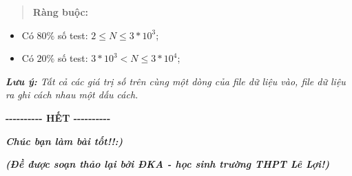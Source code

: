 \documentclass[
]{article}
\begin{document}
\begin{quote}
\textbf{Ràng buộc:}
\end{quote}

\begin{itemize}
\item
  Có \(80\%\) số test: \(2 \leq N \leq 3*10^{3}\);
\item
  Có \(20\%\) số test: \(3*10^{3} < N \leq 3*10^{4}\);
\end{itemize}

\emph{\textbf{Lưu ý:} Tất cả các giá trị số trên cùng một dòng của file
dữ liệu vào, file dữ liệu ra ghi cách nhau một dấu cách.}

\textbf{-\/-\/-\/-\/-\/-\/-\/-\/-\/- HẾT -\/-\/-\/-\/-\/-\/-\/-\/-\/-}

\emph{\textbf{Chúc bạn làm bài tốt!!:)}}

\emph{\textbf{(Đề được soạn thảo lại bởi ĐKA - học sinh trường THPT Lê
Lợi!)}}
\end{document}

